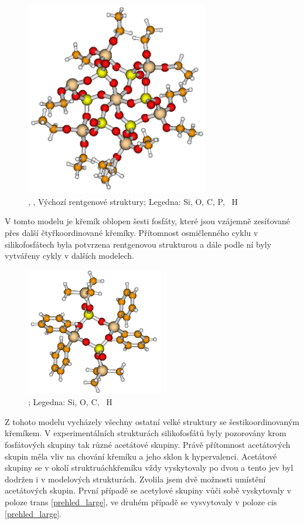 \documentclass[
  digital, %
  table,   %
  lof,     %
  lot,     %
  oneside,
]{fithesis3}
\begin{document}
\begin{figure}
\begin{center}
\includegraphics[width=8cm]{rtg_6.png}
\caption{ , \cite{C3NJ00721A}, Výchozí rentgenové struktury;  Legedna:  Si,  O,  C,   P, ~H}
\label{rtg_6}
\end{center}
\end{figure}
V tomto modelu je křemík oblopen šesti fosfáty, které jsou vzájemně zesíťované přes další čtyřkoordinované křemíky. Přítomnost osmičlenného cyklu v silikofosfátech byla potvrzena rentgenovou strukturou \cite{rtg_4} a dále podle ní byly vytvářeny cykly v dalších modelech.
\begin{figure}
\begin{center}
\includegraphics[width=6cm]{rtg_4_kruh_samotne.png}
\caption{ \cite{rtg_4_pinkas};  Legedna:  Si,  O,  C, ~H}
\label{rtg_4}
\end{center}
\end{figure}
Z tohoto modelu vycházely všechny ostatní velké struktury se šestikoordinovaným křemíkem. V experimentálních strukturách silikofosfátů byly pozorovány krom fosfátových skupiny tak různé acetátové skupiny. Právě přítomnost acetátových skupin měla vliv na chování křemíku a jeho sklon k hypervalenci. Acetátové skupiny se v okolí struktruáchkřemíku vždy vyskytovaly po dvou a tento jev byl dodržen i v modelových strukturách. Zvolila jsem dvě možnosti umístění acetátových skupin. První případě se acetylové skupiny vůči sobě vyskytovaly v poloze trans \ref{prehled_large}, ve druhém případě se vysvytovaly v poloze cis \ref{prehled_large}.
\end{document}
